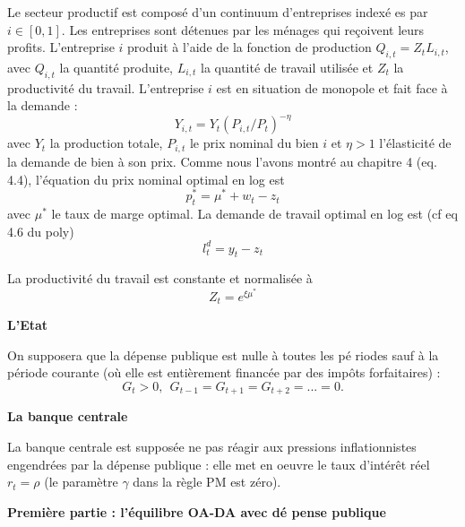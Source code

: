\documentclass[a4paper,11pt]{article}
\begin{document}
Le secteur productif est compos\'{e} d'un continuum d'entreprises index\'{e}%
es par $i\in \left[ 0,1\right] $.  Les entreprises sont détenues par les ménages qui reçoivent leurs profits.
 L'entreprise $i$ produit \`{a} l'aide de la fonction de production $Q_{i,t}=Z_{t}L_{i,t}$, avec $Q_{i,t}$ 
 la quantit\'{e} produite, $L_{i,t}$ la quantit\'{e} de travail utilis\'{e}e et $Z_{t}$
la productivit\'{e} du travail. L'entreprise $i$ est en situation de monopole et
fait face \`{a} la demande :%
\begin{equation*}
Y_{i,t}=Y_{t}\left( P_{i,t}/P_{t}\right) ^{-\eta }
\end{equation*}%
avec $Y_{t}$ la production totale, $P_{i,t}$ le prix nominal du bien $i$ et $%
\eta >1$ l'\'{e}lasticit\'{e} de la demande de bien \`{a} son prix. Comme nous l'avons montr\'{e} au chapitre 4 (eq. 4.4), l'\'{e}quation du prix nominal optimal en log est 
\begin{equation*}
p^{\ast}_{t}=\mu^{\ast} +w_t-z_t
\end{equation*}%
avec $\mu^{\ast}$ le taux de marge optimal. La demande de travail optimal en log est (cf eq 4.6 du poly)
\begin{equation*}
l_{t}^{d}=y_{t}-z_{t}
\end{equation*} 

La productivit\'{e} du travail est constante et normalis\'{e}e \`{a} 
\begin{equation*}
Z_{t}=e^{\xi \mu^{\ast}}
\end{equation*}


\noindent \textbf{L'Etat}

On supposera que la d\'{e}pense publique est nulle \`{a} toutes les p\'{e}%
riodes sauf \`{a} la p\'{e}riode courante (o\`{u} elle est enti\`{e}rement
financ\'{e}e par des imp\^{o}ts forfaitaires) :%
\begin{equation*}
G_{t}>0,\ \ G_{t-1}=G_{t+1}=G_{t+2}=...=0.
\end{equation*}

\noindent \textbf{La banque centrale}

La banque centrale est suppos\'{e}e ne pas r\'{e}agir aux pressions
inflationnistes engendr\'{e}es par la d\'{e}pense publique : elle met en
oeuvre le taux d'int\'{e}r\^{e}t r\'{e}el $r_{t}=\rho $ (le param\`{e}tre $\gamma$ dans la r\`{e}gle PM est z\'{e}ro).

\bigskip

\noindent \textbf{Premi\`{e}re partie : l'\'{e}quilibre OA-DA avec d\'{e}%
pense publique}
\end{document}
